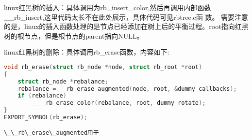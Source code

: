 linux红黑树的插入：具体调用为rb\_insert\_color,然后再调用内部函数\_\_rb\_insert,这里代码太长不在此处展示，具体代码可见rbtree.c函 数。
需要注意的是，linux的插入函数处理的是节点已经添加在树上后的平衡过程。root指向红黑树的根节点，但是根节点的parent指向NULL。

linux红黑树的删除：具体调用rb\_erase函数，内容如下:

\begin{lstlisting}[language=C]
void rb_erase(struct rb_node *node, struct rb_root *root)
{
	struct rb_node *rebalance;
	rebalance = __rb_erase_augmented(node, root, &dummy_callbacks);
	if (rebalance)
		____rb_erase_color(rebalance, root, dummy_rotate);
}
EXPORT_SYMBOL(rb_erase);

\_\_rb\_erase\_augmented用于
\end{lstlisting}

